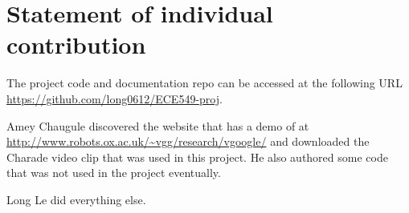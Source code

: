\documentclass[conference]{IEEEtran}
\begin{document}
\section{Statement of individual contribution}
The project code and documentation repo can be accessed at the following URL \url{https://github.com/long0612/ECE549-proj}.

Amey Chaugule discovered the website that has a demo of \cite{sivic2003video}  at 
\url{http://www.robots.ox.ac.uk/~vgg/research/vgoogle/} and downloaded the Charade video clip that was used in this project. He also
authored some code that was not used in the project eventually. 

Long Le did everything else.














%
%
%




\end{document}
